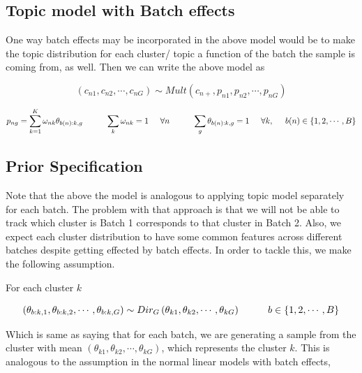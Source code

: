 \documentclass[]{article}
\begin{document}
\subsection{Topic model with Batch
effects}\label{topic-model-with-batch-effects}

One way batch effects may be incorporated in the above model would be to
make the topic distribution for each cluster/ topic a function of the
batch the sample is coming from, as well. Then we can write the above
model as

\begin{equation}
(c_{n1}, c_{n2}, \cdots, c_{nG}) \sim Mult (c_{n+}, p_{n1}, p_{n2}, \cdots, p_{nG})
\label{lab:mult}
\end{equation}

\begin{equation}
p_{ng} = \sum_{k=1}^{K} \omega_{nk} \theta_{b(n):k,g} \hspace{1 cm} \sum_{k} \omega_{nk} =1 \hspace{0.5 cm} \forall n \hspace{1 cm} \sum_{g} \theta_{b(n):k,g} =1 \hspace{0.5 cm} \forall k, \hspace{0.5 cm} b(n) \in \{1,2,\cdots, B \}
\end{equation}

\subsection{Prior Specification}\label{prior-specification}

Note that the above the model is analogous to applying topic model
separately for each batch. The problem with that approach is that we
will not be able to track which cluster is Batch 1 corresponds to that
cluster in Batch 2. Also, we expect each cluster distribution to have
some common features across different batches despite getting effected
by batch effects. In order to tackle this, we make the following
assumption.

For each cluster \(k\)

\begin{equation}
(\theta_{b:k, 1}, \theta_{b:k, 2}, \cdots, \theta_{b:k, G}) \sim Dir_{G} \left ( \theta_{k1}, \theta_{k2}, \cdots, \theta_{kG} \right ) \hspace{1 cm} b \in \{1,2, \cdots, B \} 
\label{lab:prior}
\end{equation}

Which is same as saying that for each batch, we are generating a sample
from the cluster with mean
\((\theta_{k1}, \theta_{k2}, \cdots, \theta_{kG})\), which represents
the cluster \(k\). This is analogous to the assumption in the normal
linear models with batch effects,
\end{document}

